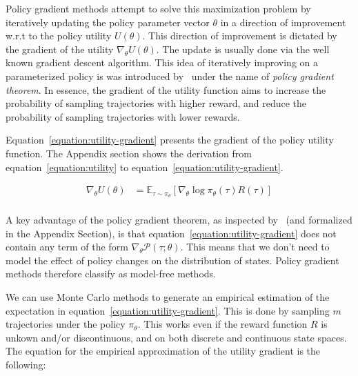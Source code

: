\documentclass{../main.tex}{subfiles}
\begin{document}
Policy gradient methods attempt to solve this maximization problem by iteratively updating the policy parameter vector $\theta$ in a direction of improvement w.r.t to the policy utility $U(\theta)$. This direction of improvement is dictated by the gradient of the utility $\nabla_{\theta}U(\theta)$. The update is usually done via the well known gradient descent algorithm. This idea of iteratively improving on a parameterized policy is was introduced by~\cite{Williams1992} under the name of \textit{policy gradient theorem}. In essence, the gradient of the utility function aims to increase the probability of sampling trajectories with higher reward, and reduce the probability of sampling trajectories with lower rewards.

Equation~\ref{equation:utility-gradient} presents the gradient of the policy utility function. The Appendix section shows the derivation from equation~\ref{equation:utility} to equation~\ref{equation:utility-gradient}.

\begin{equation}\label{equation:utility-gradient}
\begin{aligned}
\nabla_{\theta} U(\theta) & = \mathbb{E}_{\tau \sim \pi_{\theta}} [\nabla_{\theta} \log \pi_{\theta}(\tau) R(\tau)] \\
\end{aligned}
\end{equation}

A key advantage of the policy gradient theorem, as inspected by~\cite{Sutton1999} (and formalized in the Appendix Section), is that equation~\ref{equation:utility-gradient} does not contain any term of the form $\nabla_{\theta}\mathcal{P}(\tau ; \theta)$. This means that we don't need to model the effect of policy changes on the distribution of states. Policy gradient methods therefore classify as model-free methods. 


We can use Monte Carlo methods to generate an empirical estimation of the expectation in equation~\ref{equation:utility-gradient}. This is done by sampling $m$ trajectories under the policy $\pi_{\theta}$. This works even if the reward function $R$ is unkown and/or discontinuous, and on both discrete and continuous state spaces. The equation for the empirical approximation of the utility gradient is the following:
\end{document}

